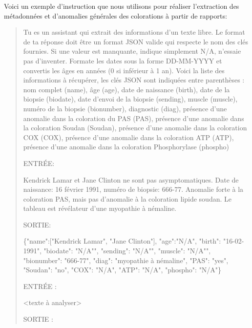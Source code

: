 Voici un exemple d'instruction que nous utilisons pour réaliser l'extraction des métadonnées et d'anomalies générales des colorations à partir de rapports:
\begin{quote}
Tu es un assistant qui extrait des informations d'un texte libre. Le format de ta réponse doit être un format JSON valide qui respecte le nom des clés fournies. Si une valeur est manquante, indique simplement N/A, n'essaie pas d'inventer. Formate les dates sous la forme DD-MM-YYYY et convertis les âges en années (0 si inférieur à 1 an). Voici la liste des informations à récupérer, les clés JSON sont indiquées entre parenthèses : nom complet (name), âge (age), date de naissance (birth), date de la biopsie (biodate), date d'envoi de la biopsie (sending), muscle (muscle), numéro de la biopsie (bionumber), diagnostic (diag), présence d'une anomalie dans la coloration du PAS (PAS), présence d'une anomalie dans la coloration Soudan (Soudan), présence d'une anomalie dans la coloration COX (COX), présence d'une anomalie dans la coloration ATP (ATP), présence d'une anomalie dans la coloration Phosphorylase (phospho)

ENTRÉE:

Kendrick Lamar et Jane Clinton ne sont pas asymptomatiques. Date de naissance: 16 février 1991, numéro de biopsie: 666-77. Anomalie forte à la coloration PAS, mais pas d'anomalie à la coloration lipide soudan. Le tableau est révélateur d'une myopathie à némaline.

SORTIE:

\{"name":["Kendrick Lamar", "Jane Clinton"], "age":"N/A", "birth": "16-02-1991", "biodate": "N/A"", "sending": "N/A"", "muscle": "N/A"", "bionumber": "666-77", "diag": "myopathie à némaline", "PAS": "yes", "Soudan": "no", "COX": "N/A", "ATP": "N/A", "phospho": "N/A"\}

ENTRÉE :

<texte à analyser>

SORTIE :
\end{quote}

